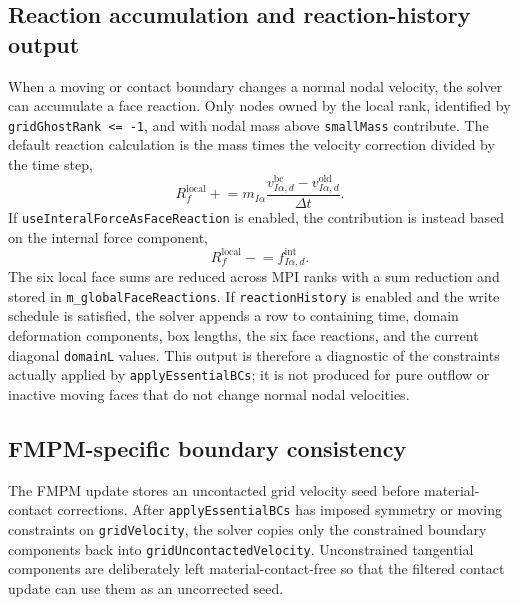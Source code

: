 \subsection{Reaction accumulation and reaction-history output}
\label{subsec:bc-reactions-internals}

When a moving or contact boundary changes a normal nodal velocity, the solver can accumulate a face reaction.  Only nodes owned by the local rank, identified by \texttt{gridGhostRank <= -1}, and with nodal mass above \texttt{smallMass} contribute.  The default reaction calculation is the mass times the velocity correction divided by the time step,
\begin{equation}
  R_f^{\mathrm{local}} \mathrel{+}= m_{I\alpha}\frac{v_{I\alpha,d}^{\mathrm{bc}}-v_{I\alpha,d}^{\mathrm{old}}}{\Delta t}.
  \label{eq:bc-reaction-momentum}
\end{equation}
If \texttt{useInteralForceAsFaceReaction} is enabled, the contribution is instead based on the internal force component,
\begin{equation}
  R_f^{\mathrm{local}} \mathrel{-}= f_{I\alpha,d}^{\mathrm{int}}.
  \label{eq:bc-reaction-internal-force}
\end{equation}
The six local face sums are reduced across MPI ranks with a sum reduction and stored in \texttt{m\_globalFaceReactions}.  If \texttt{reactionHistory} is enabled and the write schedule is satisfied, the solver appends a row to  containing time, domain deformation components, box lengths, the six face reactions, and the current diagonal \texttt{domainL} values.  This output is therefore a diagnostic of the constraints actually applied by \texttt{applyEssentialBCs}; it is not produced for pure outflow or inactive moving faces that do not change normal nodal velocities.

\subsection{FMPM-specific boundary consistency}
\label{subsec:bc-fmpm-internals}

The FMPM update stores an uncontacted grid velocity seed before material-contact corrections.  After \texttt{applyEssentialBCs} has imposed symmetry or moving constraints on \texttt{gridVelocity}, the solver copies only the constrained boundary components back into \texttt{gridUncontactedVelocity}.  Unconstrained tangential components are deliberately left material-contact-free so that the filtered contact update can use them as an uncorrected seed.

